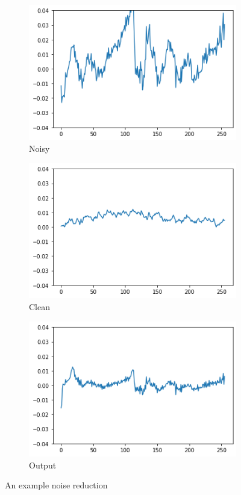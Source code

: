\documentclass{article}
\begin{document}
	\begin{figure}[!h]
		\centering
		\begin{subfigure}{.5\textwidth}
			\centering
			\includegraphics[width=.8\linewidth]{test_noisy}
			\caption{Noisy}
			\label{fig:test_noisy}
		\end{subfigure}%
		\begin{subfigure}{.5\textwidth}
			\centering
			\includegraphics[width=.8\linewidth]{test_clean_orig}
			\caption{Clean}
			\label{fig:test_clean_orig}
		\end{subfigure}
		\begin{subfigure}{1\textwidth}
			\centering
			\includegraphics[width=.4\linewidth]{test_clean}
			\caption{Output}
			\label{fig:test_clean}
		\end{subfigure}
		\caption{An example noise reduction}
		\label{fig:test}
	\end{figure}
\end{document}
